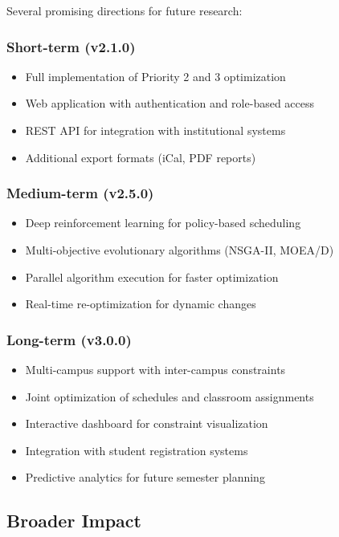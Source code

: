 \documentclass[algorithms,article,submit,pdftex,moreauthors]{Definitions/mdpi}
\begin{document}
Several promising directions for future research:

\subsubsection{Short-term (v2.1.0)}

\begin{itemize}
\item Full implementation of Priority 2 and 3 optimization
\item Web application with authentication and role-based access
\item REST API for integration with institutional systems
\item Additional export formats (iCal, PDF reports)
\end{itemize}

\subsubsection{Medium-term (v2.5.0)}

\begin{itemize}
\item Deep reinforcement learning for policy-based scheduling
\item Multi-objective evolutionary algorithms (NSGA-II, MOEA/D)
\item Parallel algorithm execution for faster optimization
\item Real-time re-optimization for dynamic changes
\end{itemize}

\subsubsection{Long-term (v3.0.0)}

\begin{itemize}
\item Multi-campus support with inter-campus constraints
\item Joint optimization of schedules and classroom assignments
\item Interactive dashboard for constraint visualization
\item Integration with student registration systems
\item Predictive analytics for future semester planning
\end{itemize}

\subsection{Broader Impact}
\end{document}
